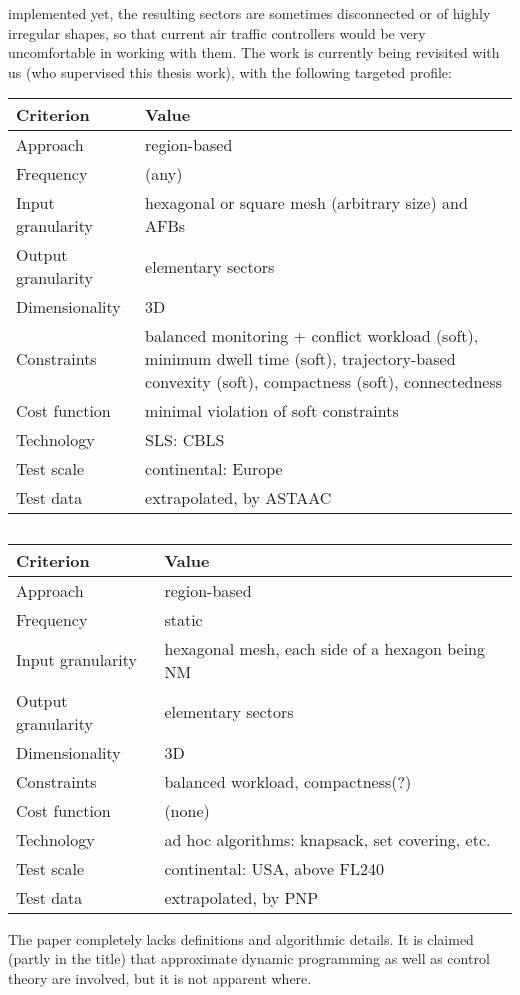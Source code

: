 \documentclass[a4paper,12pt]{article}
\begin{document}
implemented yet, the resulting sectors are sometimes disconnected or
of highly irregular shapes, so that current air traffic controllers
would be very uncomfortable in working with them.
The work is currently being revisited with us (who supervised this
thesis work), with the following targeted profile:
\begin{center}
\begin{tabular}{|l|l|}
  \hline
  Criterion & Value \\
  \hline\hline
  Approach & region-based \\ \hline
  Frequency & (any) \\ \hline
  Input granularity & hexagonal or square mesh (arbitrary size) and AFBs \\ \hline
  Output granularity & elementary sectors \\ \hline
  Dimensionality & 3D \\ \hline
  Constraints & \parbox{11.5cm}{balanced monitoring + conflict
    workload (soft), minimum dwell time (soft), trajectory-based
    convexity (soft), compactness (soft), connectedness} \\ \hline
  Cost function & minimal violation of soft constraints \\ \hline
  Technology & SLS: CBLS \\ \hline
  Test scale & continental: Europe \\ \hline
  Test data & extrapolated, by ASTAAC \\ \hline
\end{tabular}
\end{center}

\subsection{\cite{Kulkarni:ICNS11}}

\begin{center}
\begin{tabular}{|l|l|}
  \hline
  Criterion & Value \\
  \hline\hline
  Approach & region-based \\ \hline
  Frequency & static \\ \hline
  Input granularity & hexagonal mesh, each side of a hexagon being  NM \\ \hline
  Output granularity & elementary sectors \\ \hline
  Dimensionality & 3D \\ \hline
  Constraints & balanced workload, compactness(?) \\ \hline
  Cost function & (none) \\ \hline
  Technology & ad hoc algorithms: knapsack, set covering, etc. \\ \hline
  Test scale & continental: USA, above FL240 \\ \hline
  Test data & extrapolated, by PNP \\ \hline
\end{tabular}
\end{center}
The paper completely lacks definitions and algorithmic details.  It is
claimed (partly in the title) that approximate dynamic programming as
well as control theory are involved, but it is not apparent where.
\end{document}
